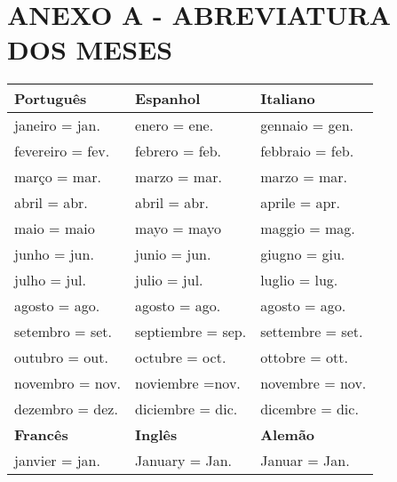 \renewcommand{\thechapter}{}%
\chapter{ANEXO A - ABREVIATURA DOS MESES} %
\label{anexoA} %
\renewcommand{\thechapter}{A}%

\begin{table}[!ht]
 \label{tab:abreviaturas}
  \begin{center}
 	\begin{tabular}{lll}
	 \hline
	  \textbf{Português}    & \textbf{Espanhol}  & \textbf{Italiano}\\ 
   \hline
       janeiro   = jan.   & enero = ene.       & gennaio = gen.\\
       fevereiro = fev.   & febrero = feb.     & febbraio = feb.\\
       março     = mar.   & marzo = mar.       & marzo = mar.\\
       abril     = abr.   & abril = abr.       & aprile = apr.\\
       maio      = maio   & mayo = mayo        & maggio = mag.\\ 
       junho     = jun.   & junio = jun.       & giugno = giu.\\ 
       julho     = jul.   & julio = jul.       & luglio = lug.\\
       agosto    = ago.   & agosto = ago.      & agosto = ago.\\
       setembro  = set.   & septiembre = sep.  & settembre = set.\\
       outubro   = out.   & octubre = oct.     & ottobre = ott.\\
       novembro  = nov.   & noviembre =nov.    & novembre = nov.\\
       dezembro  = dez.   & diciembre = dic.   & dicembre = dic.\\ 
     \hline
   \textbf{Francês}       & \textbf{Inglês}    & \textbf{Alemão}\\
     \hline
       janvier = jan.     & January = Jan.     & Januar = Jan.\\

\end{tabular}
\end{center}
\end{table}
